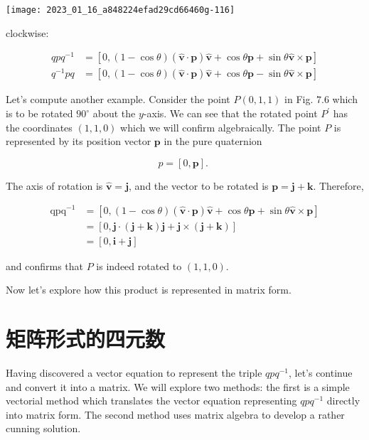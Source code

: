 \begin{center}
\texttt{[image: 2023\_01\_16\_a848224efad29cd66460g-116]}
\end{center}

clockwise:

$$
\begin{aligned}
q p q^{-1} & =[0,(1-\cos \theta)(\hat{\mathbf{v}} \cdot \mathbf{p}) \hat{\mathbf{v}}+\cos \theta \mathbf{p}+\sin \theta \hat{\mathbf{v}} \times \mathbf{p}] \\
q^{-1} p q & =[0,(1-\cos \theta)(\hat{\mathbf{v}} \cdot \mathbf{p}) \hat{\mathbf{v}}+\cos \theta \mathbf{p}-\sin \theta \hat{\mathbf{v}} \times \mathbf{p}]
\end{aligned}
$$

Let's compute another example. Consider the point $P(0,1,1)$ in Fig. $7.6$ which is to be rotated $90^{\circ}$ about the $y$-axis. We can see that the rotated point $P^{\prime}$ has the coordinates $(1,1,0)$ which we will confirm algebraically. The point $P$ is represented by its position vector $\mathbf{p}$ in the pure quaternion

$$
p=[0, \mathbf{p}] \text {. }
$$

The axis of rotation is $\hat{\mathbf{v}}=\mathbf{j}$, and the vector to be rotated is $\mathbf{p}=\mathbf{j}+\mathbf{k}$. Therefore,

$$
\begin{aligned}
\operatorname{qpq}^{-1} & =[0,(1-\cos \theta)(\hat{\mathbf{v}} \cdot \mathbf{p}) \hat{\mathbf{v}}+\cos \theta \mathbf{p}+\sin \theta \hat{\mathbf{v}} \times \mathbf{p}] \\
& =[0, \mathbf{j} \cdot(\mathbf{j}+\mathbf{k}) \mathbf{j}+\mathbf{j} \times(\mathbf{j}+\mathbf{k})] \\
& =[0, \mathbf{i}+\mathbf{j}]
\end{aligned}
$$

and confirms that $P$ is indeed rotated to $(1,1,0)$.

Now let's explore how this product is represented in matrix form.

\section{矩阵形式的四元数}
Having discovered a vector equation to represent the triple $q p q^{-1}$, let's continue and convert it into a matrix. We will explore two methods: the first is a simple vectorial method which translates the vector equation representing $q p q^{-1}$ directly into matrix form. The second method uses matrix algebra to develop a rather cunning solution.

